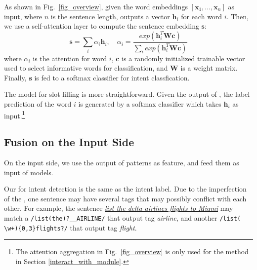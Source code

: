 As shown in Fig.~\ref{fig_overview}, given the word embeddings $[\textbf{x}_1, ..., \textbf{x}_n]$ as input, where $n$ is the sentence length, \BLSTM outputs a vector $\textbf{h}_i$ for each word $i$.
Then, we use a self-attention layer to compute the sentence embedding $\textbf{s}$:
\begin{equation}
\textbf{s} = \sum_{i}{\alpha_i\textbf{h}_i}, \quad \alpha_i=\frac{exp(\textbf{h}_i^T\textbf{Wc})}{\sum_{i}{exp(\textbf{h}_i^T\textbf{Wc})}}
\label{eq:simple_att}
\end{equation}
where  $\alpha_i$ is the attention for word $i$, $\textbf{c}$ is a randomly initialized trainable vector used to select informative words for classification, and $\textbf{W}$ is a weight matrix.
Finally, $\textbf{s}$ is fed to a softmax classifier for intent classfication.

The model for slot filling is more straightforward. Given the output of \BLSTM, the label prediction of the word $i$ is generated by a
softmax classifier which takes $\textbf{h}_i$ as input.\footnote{The attention aggregation in Fig.~\ref{fig_overview} is only used for the
method in Section \ref{interact_with_module}.}


\subsection{Fusion on the Input Side}
\label{fusion_with_input}
On the input side, we use the output of \RE patterns as feature, and feed them as input of \NN models.

Our \REtag for intent detection is the same as the intent label.
Due to the imperfection of the \REs, one sentence may have several \RE tags that may possibly conflict with each other. For example, the
sentence \textsl{\underline{list the delta airlines flights to Miami}} may match a \RE \texttt{/list(\;the)?\;\_\_AIRLINE/} that output
tag \emph{airline}, and another \RE \texttt{/list(\,\textbackslash w+)\{0,3\}\;flights?/} that output tag \emph{flight}.

